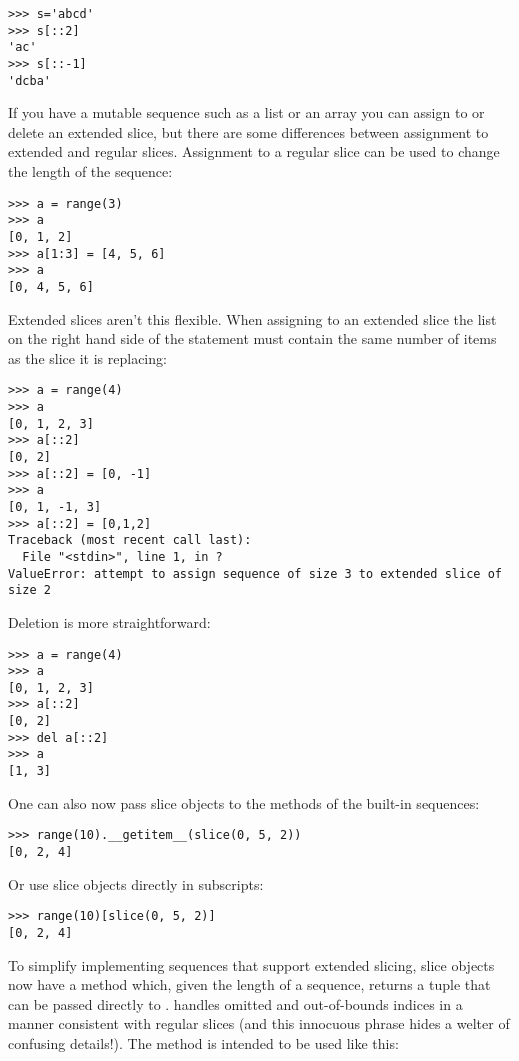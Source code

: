 \documentclass{howto}
\begin{document}
\begin{verbatim}
>>> s='abcd'
>>> s[::2]
'ac'
>>> s[::-1]
'dcba'
\end{verbatim}

If you have a mutable sequence such as a list or an array you can
assign to or delete an extended slice, but there are some differences
between assignment to extended and regular slices.  Assignment to a
regular slice can be used to change the length of the sequence:

\begin{verbatim}
>>> a = range(3)
>>> a
[0, 1, 2]
>>> a[1:3] = [4, 5, 6]
>>> a
[0, 4, 5, 6]
\end{verbatim}

Extended slices aren't this flexible.  When assigning to an extended
slice the list on the right hand side of the statement must contain
the same number of items as the slice it is replacing:

\begin{verbatim}
>>> a = range(4)
>>> a
[0, 1, 2, 3]
>>> a[::2]
[0, 2]
>>> a[::2] = [0, -1]
>>> a
[0, 1, -1, 3]
>>> a[::2] = [0,1,2]
Traceback (most recent call last):
  File "<stdin>", line 1, in ?
ValueError: attempt to assign sequence of size 3 to extended slice of size 2
\end{verbatim}

Deletion is more straightforward:

\begin{verbatim}
>>> a = range(4)
>>> a
[0, 1, 2, 3]
>>> a[::2]
[0, 2]
>>> del a[::2]
>>> a
[1, 3]
\end{verbatim}

One can also now pass slice objects to the
 methods of the built-in sequences:

\begin{verbatim}
>>> range(10).__getitem__(slice(0, 5, 2))
[0, 2, 4]
\end{verbatim}

Or use slice objects directly in subscripts:

\begin{verbatim}
>>> range(10)[slice(0, 5, 2)]
[0, 2, 4]
\end{verbatim}

To simplify implementing sequences that support extended slicing,
slice objects now have a method  which,
given the length of a sequence, returns a  tuple that can be passed directly to
.
 handles omitted and out-of-bounds indices in a
manner consistent with regular slices (and this innocuous phrase hides
a welter of confusing details!).  The method is intended to be used
like this:
\end{document}
